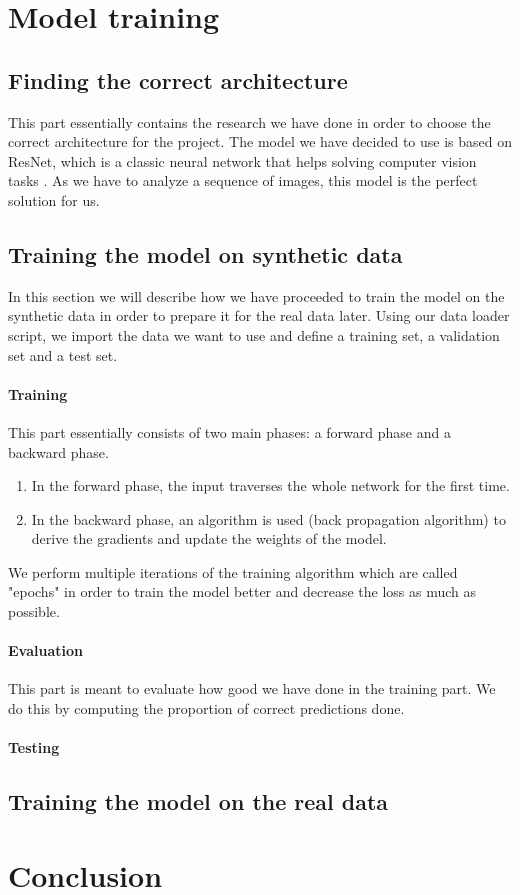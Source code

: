 \documentclass[10pt,conference]{IEEEtran}
\begin{document}
\section{Model training}
\subsection{Finding the correct architecture}
This part essentially contains the research we have done in order to choose the correct architecture for the project. The model we have decided to use is based on ResNet, which is a classic neural network that helps solving computer vision tasks \cite{hara3dcnns}. As we have to analyze a sequence of images, this model is the perfect solution for us.

\subsection{Training the model on synthetic data}
In this section we will describe how we have proceeded to train the model on the synthetic data in order to prepare it for the real data later. Using our data loader script, we import the data we want to use and define a training set, a validation set and a test set.
\paragraph{Training} This part essentially consists of two main phases: a forward phase and a backward phase.
\begin{enumerate}
  \item In the forward phase, the input traverses the whole network for the first time.
  \item In the backward phase, an algorithm is used (back propagation algorithm) to derive the gradients and update the weights of the model.
\end{enumerate}
We perform multiple iterations of the training algorithm which are called "epochs" in order to train the model better and decrease the loss as much as possible.
\paragraph{Evaluation} This part is meant to evaluate how good we have done in the training part. We do this by computing the proportion of correct predictions done.
\paragraph{Testing} %

\subsection{Training the model on the real data}

\section{Conclusion}



\end{document}
